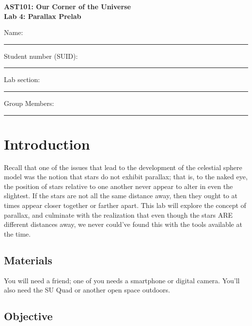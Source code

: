 \documentclass[11pt]{article}
\begin{document}
\begin{center}
\textbf{\Large
AST101: Our Corner of the Universe \\
\vspace*{0.1cm}
Lab 4: Parallax Prelab
}
\end{center}

\vspace*{0.5cm}

{\Large Name:}\vspace*{0.5cm}\\\hrule
{\Large Student number (SUID):}\vspace*{0.5cm}\\\hrule
{\Large Lab section:}\vspace*{0.5cm}\\\hrule
{\Large Group Members:}\vspace*{0.5cm}\\\hrule
\vspace*{0.5cm}

\section{Introduction}

Recall that one of the issues that lead to the development of the celestial sphere model was the notion that stars do not exhibit parallax; that is, to the naked eye, the position of stars relative to one another never appear to alter in even the slightest. If the stars are not all the same distance away, then they ought to at times appear closer together or farther apart. This lab will explore the concept of parallax, and culminate with the realization that even though the stars ARE different distances away, we never could've found this with the tools available at the time. 

\subsection*{Materials}

You will need a friend; one of you needs a smartphone or digital camera. You'll also need the SU Quad or another open space outdoors.

\subsection*{Objective}
\end{document}
